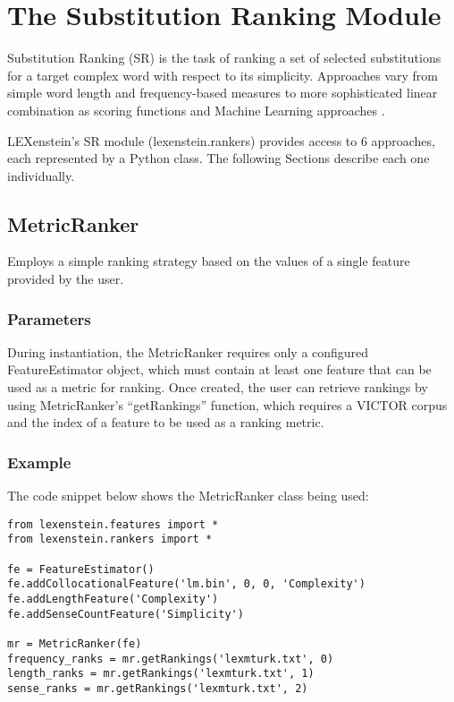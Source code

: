 \chapter{The Substitution Ranking Module}
\label{rankers}

Substitution Ranking (SR) is the task of ranking a set of selected substitutions for a target complex word with respect to its simplicity. Approaches vary from simple word length and frequency-based measures \cite{Devlin1998,Carroll98,Carroll99,Biran2011} to more sophisticated linear combination as scoring functions \cite{uowshef} and Machine Learning approaches \cite{Horn2014}.

LEXenstein's SR module (lexenstein.rankers) provides access to $6$ approaches, each represented by a Python class. The following Sections describe each one individually.












\section{MetricRanker}

Employs a simple ranking strategy based on the values of a single feature provided by the user.

\subsection{Parameters}

During instantiation, the MetricRanker requires only a configured FeatureEstimator object, which must contain at least one feature that can be used as a metric for ranking. Once created, the user can retrieve rankings by using MetricRanker's ``getRankings'' function, which requires a VICTOR corpus and the index of a feature to be used as a ranking metric.

\subsection{Example}

The code snippet below shows the MetricRanker class being used:

\begin{lstlisting}
from lexenstein.features import *
from lexenstein.rankers import *

fe = FeatureEstimator()
fe.addCollocationalFeature('lm.bin', 0, 0, 'Complexity')
fe.addLengthFeature('Complexity')
fe.addSenseCountFeature('Simplicity')

mr = MetricRanker(fe)
frequency_ranks = mr.getRankings('lexmturk.txt', 0)
length_ranks = mr.getRankings('lexmturk.txt', 1)
sense_ranks = mr.getRankings('lexmturk.txt', 2)
\end{lstlisting}










